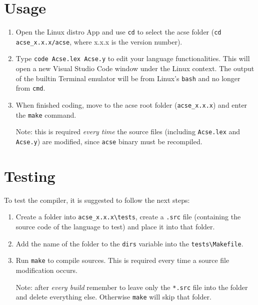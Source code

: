 \documentclass{article}
\begin{document}
\section{Usage}
\begin{enumerate}
  \item Open the Linux distro App and use \verb+cd+ to select the acse folder (\verb+cd acse_x.x.x/acse+, where x.x.x is the version number).
  \item Type \verb+code Acse.lex Acse.y+ to edit your language functionalities. This will open a new Visual Studio Code window under the Linux context. The output of the builtin Terminal emulator will be from Linux's \verb+bash+ and no longer from \verb+cmd+.
  \item When finished coding, move to the acse root folder (\verb+acse_x.x.x+) and enter the \verb+make+ command. \newline \newline \begin{small} Note: this is required \emph{every time} the source files (including \verb+Acse.lex+ and \verb+Acse.y+) are modified, since \verb+acse+ binary must be recompiled.\end{small}
\end{enumerate}
\section{Testing}
To test the compiler, it is suggested to follow the next steps:
\begin{enumerate}
  \item Create a folder into \verb+acse_x.x.x\tests+, create a \verb+.src+ file (containing the source code of the language to test) and place it into that folder.
  \item Add the name of the folder to the \verb+dirs+ variable into the \verb+tests\Makefile+.
  \item Run \verb+make+ to compile sources. This is required every time a source file modification occurs.
  \newline \newline \begin{small}Note: after \emph{every build} remember to leave only the \verb+*.src+ file into the folder and delete everything else. Otherwise \verb+make+ will skip that folder.\end{small}
\end{enumerate}
\end{document}
